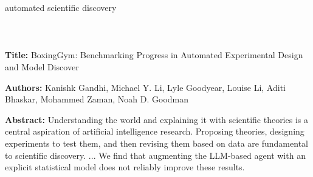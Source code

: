 \begin{textcolorbox}
automated scientific discovery
\\\\
\\\\
\textbf{Title:} BoxingGym: Benchmarking Progress in Automated Experimental Design and Model Discover

\textbf{Authors:} Kanishk Gandhi, Michael Y. Li, Lyle Goodyear, Louise Li, Aditi Bhaskar, Mohammed Zaman, Noah D. Goodman

\textbf{Abstract:} Understanding the world and explaining it with scientific theories is a central aspiration of artificial intelligence research. Proposing theories, designing experiments to test them, and then revising them based on data are fundamental to scientific discovery. 
...
We find that augmenting the LLM-based agent with an explicit statistical model does not reliably improve these results.


\end{textcolorbox}
